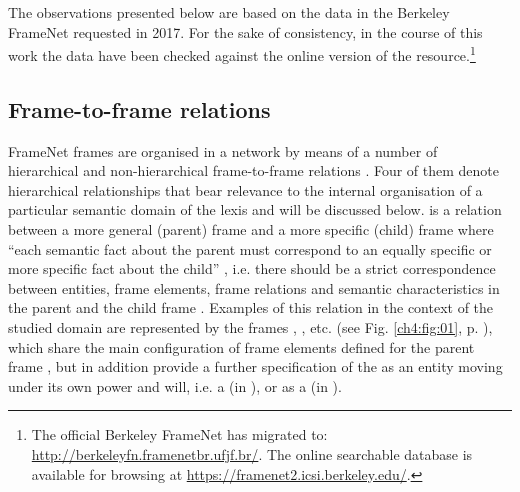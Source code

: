 \documentclass[output=paper,colorlinks,citecolor=brown]{langscibook}
\begin{document}
The observations presented below are based on the data in the Berkeley FrameNet requested in 2017. For the sake of consistency, in the course of this work the data have been checked against the online version of the resource.\footnote{The official Berkeley FrameNet has migrated to: \url{http://berkeleyfn.framenetbr.ufjf.br/}. The online searchable database is available for browsing at \url{https://framenet2.icsi.berkeley.edu/}.} 


\subsection{Frame-to-frame relations}

FrameNet frames are organised in a network by means of a number of hierarchical and non-hierarchical frame-to-frame relations \citep[81--84]{Ruppenhofer2016}. Four of them denote hierarchical relationships that bear relevance to the internal organisation of a particular semantic domain of the lexis and will be discussed below.  is a relation between a more general (parent) frame and a more specific (child) frame where ``each semantic fact about the parent must correspond to an equally specific or more specific fact about the child'' \citep[81–82]{Ruppenhofer2016}, i.e. there should be a strict correspondence between entities, frame elements, frame relations and semantic characteristics in the parent and the child frame \citep{Petruck2015}. Examples of this relation in the context of the studied domain are represented by the frames , , etc. (see Fig. \ref{ch4:fig:01}, p. \pageref{ch4:fig:01}), which share the main configuration of frame elements defined for the parent frame , but in addition provide a further specification of the  as an entity moving under its own power and will, i.e. a  (in ), or as a  (in ).
\end{document}
